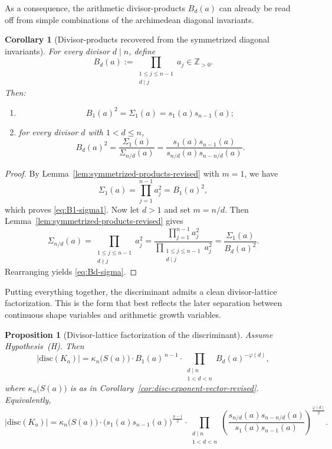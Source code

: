 \documentclass[11pt,letterpaper]{amsart}
\newcommand{\Z}{\mathbb{Z}}
\newcommand{\disc}{\mathrm{disc}}
\theoremstyle{plain}
\newtheorem{proposition}[theorem]{Proposition}
\newtheorem{corollary}[theorem]{Corollary}
\theoremstyle{definition}
\begin{document}
As a consequence, the arithmetic divisor-products \(B_d(a)\) can already be read off from simple combinations of the archimedean diagonal invariants.


\begin{corollary}[Divisor-products recovered from the symmetrized diagonal invariants]
\label{cor:divisor-products-revised}
For every divisor $d\mid n$, define
\[
B_d(a):=\prod_{\substack{1\le j\le n-1\\ d\mid j}} a_j\in \Z_{>0}.
\]
Then:
\begin{enumerate}[label=\textup{(\roman*)},leftmargin=2.4em]
\item
\begin{equation}\label{eq:B1-sigma1}
B_1(a)^2=\Sigma_1(a)=s_1(a)s_{n-1}(a);
\end{equation}
\item for every divisor $d$ with $1<d\le n$,
\begin{equation}\label{eq:Bd-sigma}
B_d(a)^2=\frac{\Sigma_1(a)}{\Sigma_{n/d}(a)}
=\frac{s_1(a)s_{n-1}(a)}{s_{n/d}(a)s_{n-n/d}(a)}.
\end{equation}
\end{enumerate}
\end{corollary}

\begin{proof}
By Lemma~\ref{lem:symmetrized-products-revised} with $m=1$, we have
\[
\Sigma_1(a)=\prod_{j=1}^{n-1} a_j^2=B_1(a)^2,
\]
which proves \eqref{eq:B1-sigma1}.
Now let $d>1$ and set $m=n/d$.
Then Lemma~\ref{lem:symmetrized-products-revised} gives
\[
\Sigma_{n/d}(a)=\prod_{\substack{1\le j\le n-1\\ d\nmid j}} a_j^2
=\frac{\prod_{j=1}^{n-1} a_j^2}{\prod_{\substack{1\le j\le n-1\\ d\mid j}} a_j^2}
=\frac{\Sigma_1(a)}{B_d(a)^2}.
\]
Rearranging yields \eqref{eq:Bd-sigma}.
\end{proof}

Putting everything together, the discriminant admits a clean divisor-lattice factorization. This is the form that best reflects the later separation between continuous shape variables and arithmetic growth variables.

\begin{proposition}[Divisor-lattice factorization of the discriminant]
\label{prop:disc-divisor-factorization-revised}
Assume Hypothesis~\textup{(H)}.
Then
\begin{equation}\label{eq:disc-divisor-factorization-revised}
|\disc(K_a)|
=\kappa_n\bigl(S(a)\bigr)\cdot B_1(a)^{\,n-1}
\cdot \prod_{\substack{d\mid n\\ 1<d<n}} B_d(a)^{-\varphi(d)},
\end{equation}
where $\kappa_n\bigl(S(a)\bigr)$ is as in Corollary~\ref{cor:disc-exponent-vector-revised}.
Equivalently,
\[
|\disc(K_a)|
=\kappa_n\bigl(S(a)\bigr)\cdot \bigl(s_1(a)s_{n-1}(a)\bigr)^{\frac{n-1}{2}}
\cdot
\prod_{\substack{d\mid n\\ 1<d<n}}
\left(\frac{s_{n/d}(a)s_{n-n/d}(a)}{s_1(a)s_{n-1}(a)}\right)^{\!\frac{\varphi(d)}{2}}.
\]
\end{proposition}
\end{document}
